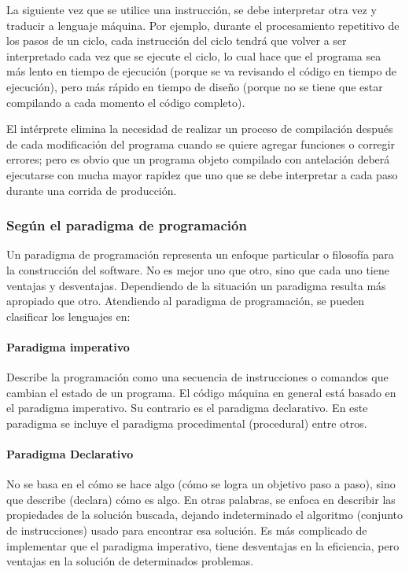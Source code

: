 \documentclass[12pt,legalpaper]{report}
\begin{document}
La siguiente vez que se utilice una instrucción, se debe interpretar otra vez y traducir a lenguaje máquina. Por ejemplo, durante el procesamiento repetitivo de los pasos de un ciclo, cada instrucción del ciclo tendrá que volver a ser interpretado cada vez que se ejecute el ciclo, lo cual hace que el programa sea más lento en tiempo de ejecución (porque se va revisando el código en tiempo de ejecución), pero más rápido en tiempo de diseño (porque no se tiene que estar compilando a cada momento el código completo). 

El intérprete elimina la necesidad de realizar un proceso de compilación después de cada modificación del programa cuando se quiere agregar funciones o corregir errores; pero es obvio que un programa objeto compilado con antelación deberá ejecutarse con mucha mayor rapidez que uno que se debe interpretar a cada paso durante una corrida de producción.

			\subsubsection{Según el paradigma de programación}

Un paradigma de programación representa un enfoque particular o filosofía para la construcción del software. No es mejor uno que otro, sino que cada uno tiene ventajas y desventajas. Dependiendo de la situación un paradigma resulta más apropiado que otro. Atendiendo al paradigma de programación, se pueden clasificar los lenguajes en:


					\paragraph{Paradigma imperativo}
				
Describe la programación como una secuencia de instrucciones o comandos que cambian el estado de un programa. El código máquina en general está basado en el paradigma imperativo. Su contrario es el paradigma declarativo. En este paradigma se incluye el paradigma procedimental (procedural) entre otros.
				
					\paragraph{Paradigma Declarativo}

No se basa en el cómo se hace algo (cómo se logra un objetivo paso a paso), sino que describe (declara) cómo es algo. En otras palabras, se enfoca en describir las propiedades de la solución buscada, dejando indeterminado el algoritmo (conjunto de instrucciones) usado para encontrar esa solución. Es más complicado de implementar que el paradigma imperativo, tiene desventajas en la eficiencia, pero ventajas en la solución de determinados problemas.
\end{document}
